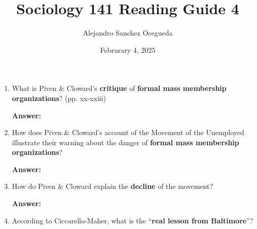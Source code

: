 \documentclass{article}
\title{Sociology 141 Reading Guide 4}
\author{Alejandro Sanchez Ocegueda}
\date{Februrary 4, 2025}
\newcommand{\answer}{\textbf{Answer:}$\;$}
\begin{document}
\maketitle

\begin{enumerate}[label=\arabic*)]
    \item What is Piven \& Cloward's \textbf{critique} of \textbf{formal mass membership organizations}? (pp. xx-xxiii)
    
    \answer 
    
    \item How does Piven \& Cloward's account of the Movement of the Unemployed illustrate their warning about the danger of \textbf{formal mass membership organizations}?
    
    \answer 
    
    
    \item How do Piven \& Cloward explain the \textbf{decline} of the movement?
   

    \answer
    
    \item According to Ciccarello-Maher, what is the ``\textbf{real lesson from Baltimore}''?
    
\end{enumerate}
 
\end{document}
